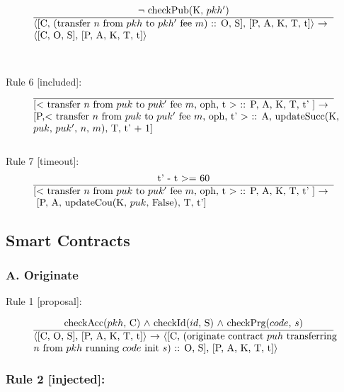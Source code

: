 \documentclass[a4paper]{llncs}
\begin{document}
\begin{equation}{}
\frac{\text{$\neg$ checkPub(K, $pkh'$)}}{\parbox{4.2in}{\text{$\langle$[C, (transfer $n$ from $pkh$ to $pkh'$ fee $m$) :: O, S], [P, A, K, T, t]$\rangle$ $\rightarrow$ }\\
\text{$\langle$[C, O, S], [P, A, K, T, t]$\rangle$}}} 
\end{equation}
\\
\\
Rule 6 [included]:
\begin{equation}{}
\frac{}{\parbox{4.2in}{\text{[$<$ transfer $n$ from $puk$ to  $puk'$ fee $m$, oph, t $>$ :: P, A, K, T, t' ] $\rightarrow$ } \\
 \text{[P,$<$ transfer $n$ from  $puk$ to $puk'$ fee $m$, oph, t' $>$ :: A, updateSucc(K, } \\
\text{$puk$, $puk'$, $n$, $m$), T, t' + 1]}}} 
\end{equation}
\\
Rule 7 [timeout]:
\begin{equation}{}
\frac{\text{t' - t $>=$ 60}}{\parbox{4.2in}{\text{[$<$ transfer $n$ from $puk$ to  $puk'$ fee $m$, oph, t $>$ :: P, A, K, T, t' ] $\rightarrow$} \\
 \hspace*{0cm} \text{[P, A, updateCou(K, $puk$, False), T, t']}}} 
\end{equation}

\subsection{Smart Contracts}

\subsubsection*{A. Originate}

Rule 1 [proposal]:

\begin{equation}{}
\frac{\text{checkAcc($pkh$, C) $\wedge$ checkId($id$, S) $\wedge$ \text{checkPrg($code$, $s$)}}}{\parbox{4.2in}{\text{$\langle$[C, O, S], [P, A, K, T, t]$\rangle$ $\rightarrow$ $\langle$[C, (originate contract ${puh}$ transferring} \\
  \text{${n}$ from ${pkh}$} \text{running ${code}$ init ${s}$) :: O, S], [P, A, K, T, t]$\rangle$}}} 
\end{equation}

\subsubsection*{Rule 2 [injected]:}
\end{document}

